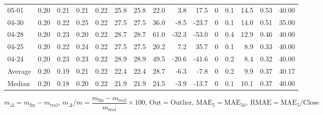 \begin{threeparttable}
{\begin{tabular}{lrrrrrrrrrrrrrr}
  05-01 &          0.20 &          0.21 &          0.21 &        0.22 &                25.8 &               25.8 &                22.0 &        3.8 &         17.5 &              0 &                 0.1 &             14.5 &            0.53 &                  40.00 \\
  04-30 &          0.20 &          0.22 &          0.25 &        0.22 &                27.5 &               27.5 &                36.0 &       -8.5 &        -23.7 &              0 &                 0.1 &             14.0 &            0.51 &                  35.00 \\
  04-28 &          0.20 &          0.23 &          0.20 &        0.22 &                28.7 &               28.7 &                61.0 &      -32.3 &        -53.0 &              0 &                 0.4 &             12.9 &            0.46 &                  40.00 \\
  04-25 &          0.20 &          0.22 &          0.24 &        0.22 &                27.5 &               27.5 &                20.2 &        7.2 &         35.7 &              0 &                 0.1 &              8.9 &            0.33 &                  40.00 \\
  04-24 &          0.20 &          0.23 &          0.23 &        0.22 &                28.9 &               28.9 &                49.5 &      -20.6 &        -41.6 &              0 &                 0.2 &              8.4 &            0.32 &                  40.00 \\
Average &          0.20 &          0.19 &          0.21 &        0.22 &                22.4 &               22.4 &                28.7 &       -6.3 &         -7.8 &              0 &                 0.2 &              9.9 &            0.37 &                  40.17 \\
 Median &          0.20 &          0.18 &          0.20 &        0.22 &                21.9 &               21.9 &                24.5 &       -3.9 &        -13.7 &              0 &                 0.1 &             10.1 &            0.37 &                  40.00 \\
\bottomrule
\end{tabular}
}
\begin{tablenotes}\footnotesize
\item $m_\Delta=m_{\text{fin}}-m_{\text{real}}$,
$m_\Delta/m=\dfrac{m_{\text{fin}}-m_{\text{real}}}{m_{\text{real}}}\times100$,
$\mathrm{Out}=\text{Outlier}$,
$\mathrm{MAE}_5=\mathrm{MAE}_{5\text{d}}$,
$\mathrm{RMAE}=\mathrm{MAE}_5/\text{Close}$
\end{tablenotes}
\end{threeparttable}
\endgroup

